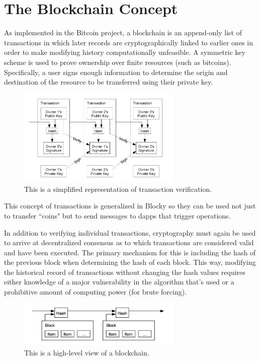 \documentclass[letterpaper]{article}
\begin{document}
\section{The Blockchain Concept}
As implemented in the Bitcoin project, a blockchain is an append-only list of transactions in which later records are cryptographically linked to earlier ones in order to make modifying history computationally unfeasible. A symmetric key scheme is used to prove ownership over finite resources (such as bitcoins). Specifically, a user signs enough information to determine the origin and destination of the resource to be transferred using their private key.

\begin{figure}[h]
\centering
\includegraphics[width=0.7\textwidth]{transaction_chain.png}
\caption{\label{fig:transaction_chain}This is a simplified representation of transaction verification\cite{nakamoto09}.}
\end{figure}

This concept of transactions is generalized in Blocky so they can be used not just to transfer ``coins" but to send messages to dapps that trigger operations.

In addition to verifying individual transactions, cryptography must again be used to arrive at decentralized consensus as to which transactions are considered valid and have been executed. The primary mechanism for this is including the hash of the previous block when determining the hash of each block. This way, modifying the historical record of transactions without changing the hash values requires either knowledge of a major vulnerability in the algorithm that's used or a prohibitive amount of computing power (for brute forcing).

\begin{figure}[h]
\centering
\includegraphics[width=0.7\textwidth]{blockchain.png}
\caption{\label{fig:blockchain}This is a high-level view of a blockchain\cite{nakamoto09}.}
\end{figure}
\end{document}
